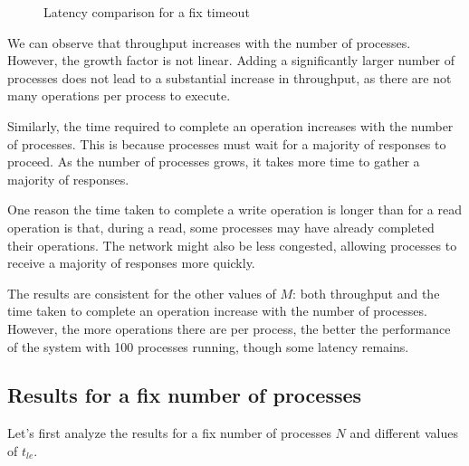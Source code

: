 \begin{figure}[ht!]
    \centering
    \caption{Latency comparison for a fix timeout}
\end{figure}


We can observe that throughput increases with the number of processes. However,
the growth factor is not linear. Adding a significantly larger number of processes
does not lead to a substantial increase in throughput, as there are not many
operations per process to execute.

Similarly, the time required to complete an operation increases with the number
of processes. This is because processes must wait for a majority of responses
to proceed. As the number of processes grows, it takes more time to gather a
majority of responses.

One reason the time taken to complete a write operation is longer than for a
read operation is that, during a read, some processes may have already completed
their operations. The network might also be less congested, allowing processes
to receive a majority of responses more quickly.

\vspace{10pt}
The results are consistent for the other values of
$M$: both throughput and the time taken to complete an operation
increase with the number of processes. However, the more operations
there are per process, the better the performance of the system with
 100 processes running, though some latency remains.

\newpage

\subsection{Results for a fix number of processes}
Let's first analyze the results for a fix number of processes $N$ and different values of $t_{le}$.

